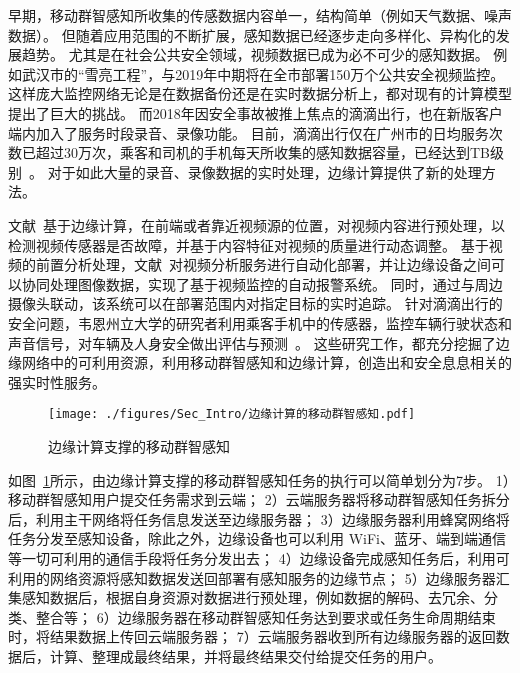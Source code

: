 

早期，移动群智感知所收集的传感数据内容单一，结构简单（例如天气数据、噪声数据）。
但随着应用范围的不断扩展，感知数据已经逐步走向多样化、异构化的发展趋势。
尤其是在社会公共安全领域，视频数据已成为必不可少的感知数据。
例如武汉市的“雪亮工程”，与2019年中期将在全市部署150万个公共安全视频监控。
这样庞大监控网络无论是在数据备份还是在实时数据分析上，都对现有的计算模型提出了巨大的挑战。
而2018年因安全事故被推上焦点的滴滴出行，也在新版客户端内加入了服务时段录音、录像功能。
目前，滴滴出行仅在广州市的日均服务次数已超过30万次，乘客和司机的手机每天所收集的感知数据容量，已经达到TB级别~\cite{DBLP:conf/aaai/Yao0KTJLGYL18}。
对于如此大量的录音、录像数据的实时处理，边缘计算提供了新的处理方法。

文献~\cite{DBLP:conf/edge/SunLS17}基于边缘计算，在前端或者靠近视频源的位置，对视频内容进行预处理，以检测视频传感器是否故障，并基于内容特征对视频的质量进行动态调整。
基于视频的前置分析处理，文献~\cite{DBLP:journals/iotj/ZhangZSZ18}对视频分析服务进行自动化部署，并让边缘设备之间可以协同处理图像数据，实现了基于视频监控的自动报警系统。
同时，通过与周边摄像头联动，该系统可以在部署范围内对指定目标的实时追踪。
针对滴滴出行的安全问题，韦恩州立大学的研究者利用乘客手机中的传感器，监控车辆行驶状态和声音信号，对车辆及人身安全做出评估与预测~\cite{DBLP:conf/edge/LiuZQS18}。
这些研究工作，都充分挖掘了边缘网络中的可利用资源，利用移动群智感知和边缘计算，创造出和安全息息相关的强实时性服务。


\begin{figure}[!h]
  \centering
  \texttt{[image: ./figures/Sec\_Intro/边缘计算的移动群智感知.pdf]}
  \vspace{-0.5em}
  \caption{边缘计算支撑的移动群智感知}
  \label{Figure_MCS_with_EC}
\end{figure}

如图~\ref{Figure_MCS_with_EC}所示，由边缘计算支撑的移动群智感知任务的执行可以简单划分为7步。
1）移动群智感知用户提交任务需求到云端；
2）云端服务器将移动群智感知任务拆分后，利用主干网络将任务信息发送至边缘服务器；
3）边缘服务器利用蜂窝网络将任务分发至感知设备，除此之外，边缘设备也可以利用 WiFi、蓝牙、端到端通信等一切可利用的通信手段将任务分发出去；
4）边缘设备完成感知任务后，利用可利用的网络资源将感知数据发送回部署有感知服务的边缘节点；
5）边缘服务器汇集感知数据后，根据自身资源对数据进行预处理，例如数据的解码、去冗余、分类、整合等；
6）边缘服务器在移动群智感知任务达到要求或任务生命周期结束时，将结果数据上传回云端服务器；
7）云端服务器收到所有边缘服务器的返回数据后，计算、整理成最终结果，并将最终结果交付给提交任务的用户。

